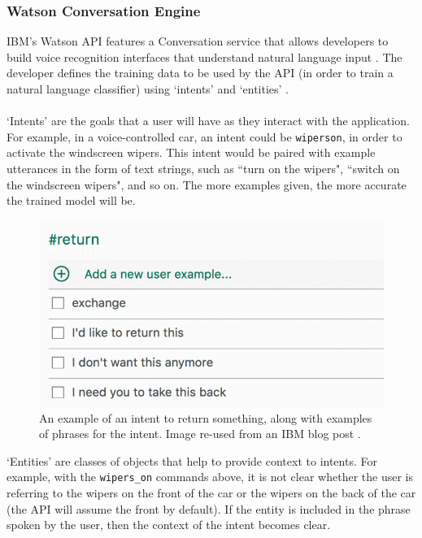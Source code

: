 \documentclass[11pt]{article}
\begin{document}
\subsubsection{Watson Conversation Engine}
\label{section:watson}

IBM's Watson API features a Conversation service that allows developers to build voice recognition interfaces that understand natural language input \cite{RefWorks:27}. The developer defines the training data to be used by the API (in order to train a natural language classifier) using `intents' and `entities' \cite{RefWorks:31}.
\\
\\
`Intents' are the goals that a user will have as they interact with the application. For example, in a voice-controlled car, an intent could be \texttt{wipers\textunderscore on}, in order to activate the windscreen wipers. This intent would be paired with example utterances in the form of text strings, such as ``turn on the wipers", ``switch on the windscreen wipers", and so on. The more examples given, the more accurate the trained model will be.
\begin{center}
\begin{figure}[H]
  \includegraphics[width=\textwidth]{intent-return.png}
  \caption{An example of an intent to return something, along with examples of phrases for the intent. Image re-used from an IBM blog post \cite{RefWorks:34}.}
\end{figure}
\end{center}
`Entities' are classes of objects that help to provide context to intents. For example, with the \texttt{wipers\_on} commands above, it is not clear whether the user is referring to the wipers on the front of the car or the wipers on the back of the car (the API will assume the front by default). If the entity is included in the phrase spoken by the user, then the context of the intent becomes clear.
\end{document}
